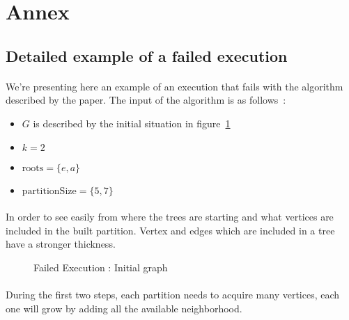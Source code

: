\section*{Annex}

\label{counter-example}
\subsection{Detailed example of a failed execution}


\paragraph{}
We're presenting here an example of an execution that fails with the algorithm
described by the paper. The input of the algorithm is as follows~:
\begin{itemize}
\item $G$ is described by the initial situation in figure~\ref{FE_K2_init}
\item $k = 2$
\item $\mathrm{roots} = \{ e, a \}$
\item $\mathrm{partitionSize} = \{ 5, 7\}$
\end{itemize}

\paragraph{}
In order to see easily from where the trees are starting and what vertices are
included in the built partition. Vertex and edges which are included in a tree
have a stronger thickness.

\begin{figure}[H]
  \caption{\label{FE_K2_init}Failed Execution : Initial graph}
  \begin{center}
    \begin{tikzpicture}[scale=0.9,transform shape]
      
    \end{tikzpicture}
  \end{center}
\end{figure}

\paragraph{}
During the first two steps, each partition needs to acquire many vertices,
each one will grow by adding all the available neighborhood.

